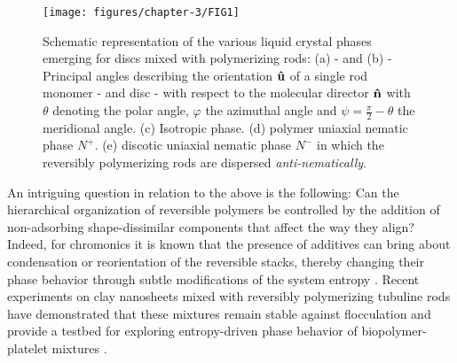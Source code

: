 \begin{figure}
  \texttt{[image: figures/chapter-3/FIG1]}
  \caption{Schematic representation of the various liquid crystal phases emerging for discs mixed with polymerizing rods: (a) - and (b) - Principal angles describing the orientation ${\bf \hat{u}}$ of a single rod monomer - and disc - with respect to the molecular director ${\bf \hat{n}}$  with $\theta$ denoting the polar angle, $\varphi$ the azimuthal angle and $\psi = \frac{\pi}{2} - \theta $ the meridional angle.  (c) Isotropic phase. (d) polymer uniaxial nematic phase $N^+$. (e) discotic uniaxial nematic phase $N^-$ in which the reversibly polymerizing rods are dispersed {\em anti-nematically}.}
  \label{fig:cartoon}
\end{figure}

An intriguing question in relation to the above is the following:  Can the hierarchical organization of reversible polymers be controlled by the addition of non-adsorbing shape-dissimilar components that affect the way they align? Indeed, for chromonics it is known that the presence of additives can bring about condensation or reorientation of the reversible stacks, thereby changing their phase behavior through subtle modifications of the system entropy \cite{tortora2010}.  Recent experiments on  clay nanosheets mixed with reversibly polymerizing tubuline rods have demonstrated that these mixtures remain stable against flocculation and provide a testbed for exploring entropy-driven phase behavior of biopolymer-platelet mixtures \cite{kato2018}.
